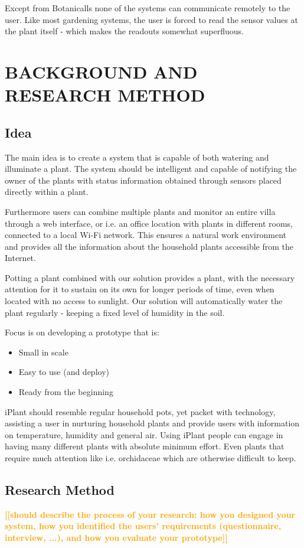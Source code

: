 \documentclass{ubicomp2012}
\newcommand{\todo}[1]{\textsf{\textbf{\textcolor{Orange}{[[#1]]}}}}
\begin{document}
Except from Botanicalls none of the systems can communicate remotely to the user. Like most gardening systems, the user is forced to read the sensor values at the plant itself - which makes the readouts somewhat superfluous.

\section{BACKGROUND AND RESEARCH METHOD}

\subsection{Idea}
The main idea is to create a system that is capable of both watering and illuminate a plant. The system should be intelligent and capable of notifying the owner of the plants with status information obtained through sensors placed directly within a plant.

Furthermore users can combine multiple plants and monitor an entire villa through a web interface, or i.e. an office location with plants in different rooms, connected to a local Wi-Fi network. This ensures a natural work environment and provides all the information about the household plants accessible from the Internet.

Potting a plant combined with our solution provides a plant, with the necessary attention for it to sustain on its own for longer periods of time, even when located with no access to sunlight. Our solution will automatically water the plant regularly - keeping a fixed level of humidity in the soil.

Focus is on developing a prototype that is:
\begin{itemize}
    \item Small in scale
    \item Easy to use (and deploy)
    \item Ready from the beginning
\end{itemize}

iPlant should resemble regular household pots, yet packet with technology, assisting a user in nurturing household plants and provide users with information on temperature, humidity and general air. Using iPlant people can engage in having many different plants with absolute minimum effort. Even plants that require much attention like i.e. orchidaceae which are otherwise difficult to keep.

\subsection{Research Method}
\todo{should describe the process of your research: how you designed your system, how you identified the users’ requirements (questionnaire, interview, ...), and how you evaluate your prototype}
\end{document}
